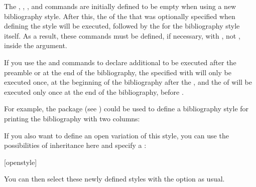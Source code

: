 The , , , and
 commands are initially defined to be empty when using a
new bibliography style. After this, the  of the  that was optionally specified when defining the style will be executed,
followed by the  for the bibliography style itself. As a
result, these commands must be defined, if necessary, with
,
not , inside the  argument.

If you use the
 and
%
 commands to declare additional
 to be executed after the preamble or at the end of the
bibliography, the  specified with
 will only be executed once, at
the beginning of the bibliography after the 
, and the  of
 will be executed only once at the end
of the bibliography, before .

For example, the
package (see \cite{package:multicol}) could be used to define a bibliography
style for printing the bibliography with two columns:
\begin{lstcode}
\end{lstcode}
If you also want to define an open variation of this style, you can use
the possibilities of inheritance here and specify a :
\begin{lstcode}
  [openstyle]{%
    \renewcommand*{\bib@beginhook}{\begin{multicols}{2}}%
    \renewcommand*{\bib@endhook}{\end{multicols}}}%
\end{lstcode}
You can then select these newly defined styles with the
 option as usual.

